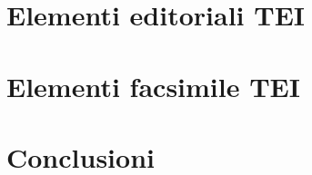 \documentclass{beamer}
\begin{document}
    
    \section{Elementi editoriali TEI}
    
    
    \section{Elementi facsimile TEI}
    
    
    
    
    \section{Conclusioni}
    
    
    
\end{document}
